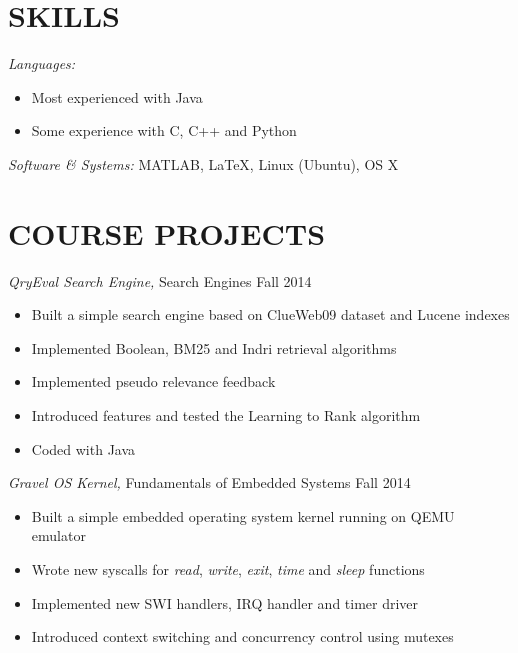 \documentclass[margin, 10pt]{res} %
\begin{document}
\begin{resume}

\section{SKILLS}

{\sl Languages:}
\begin{itemize} \itemsep -2pt %
\item Most experienced with Java
\item Some experience with C, C++ and Python
\end{itemize}
{\sl Software \& Systems:} MATLAB, \LaTeX, Linux (Ubuntu), OS X

\section{COURSE PROJECTS}
{\sl QryEval Search Engine,} Search Engines \hfill Fall 2014 
\begin{itemize} \itemsep -2pt
\item Built a simple search engine based on ClueWeb09 dataset and Lucene indexes
\item Implemented Boolean, BM25 and Indri retrieval algorithms
\item Implemented pseudo relevance feedback
\item Introduced features and tested the Learning to Rank algorithm
\item Coded with Java
\end{itemize}

{\sl Gravel OS Kernel,} Fundamentals of Embedded Systems \hfill Fall 2014 
\begin{itemize} \itemsep -2pt
\item Built a simple embedded operating system kernel running on QEMU emulator
\item Wrote new syscalls for {\sl read}, {\sl write}, {\sl exit}, {\sl time} and {\sl sleep} functions
\item Implemented new SWI handlers, IRQ handler and timer driver
\item Introduced context switching and concurrency control using mutexes
\end{itemize}




\end{resume}
\end{document}
